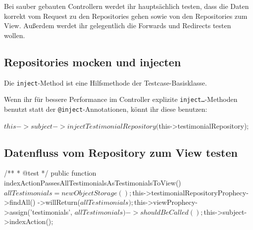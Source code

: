 \documentclass[a4paper,11pt,headsepline]{scrartcl}
\begin{document}
Bei sauber gebauten Controllern werdet ihr hauptsächlich testen, dass die Daten korrekt vom Request zu den Repositories gehen sowie von den Repositories zum View. Außerdem werdet ihr gelegentlich die Forwards und Redirects testen wollen.

\subsection{Repositories mocken und injecten}


Die \texttt{inject}-Method ist eine Hilfsmethode der Testcase-Basisklasse.

Wenn ihr für bessere Performance im Controller explizite \texttt{inject…}-Methoden benutzt statt der \texttt{@inject}-Annotationen, könnt ihr diese benutzen:

\begin{phpcode}
$this->subject->injectTestimonialRepository($this->testimonialRepository);
\end{phpcode}


\subsection{Datenfluss vom Repository zum View testen}

\begin{phpcode}
/**
  * @test
  */
public function indexActionPassesAllTestimonialsAsTestimonialsToView()
{
    $allTestimonials = new ObjectStorage();
    $this->testimonialRepositoryProphecy->findAll()
        ->willReturn($allTestimonials);

    $this->viewProphecy->assign('testimonials', $allTestimonials)
        ->shouldBeCalled();

    $this->subject->indexAction();
}
\end{phpcode}
\end{document}
